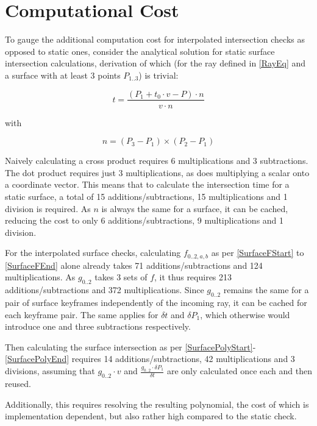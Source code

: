 \section{Computational Cost}

To gauge the additional computation cost for interpolated intersection checks as opposed to static ones,
consider the analytical solution for static surface intersection calculations,
derivation of which (for the ray defined in \eqref{RayEq} and a surface with at least 3 points \(P_{1..3}\)) is trivial:

\begin{equation}
    t = \frac{(P_1 + t_0 \cdot v - P) \cdot n}{v \cdot n}
\end{equation}

with

\begin{equation}
    n = (P_3 - P_1) \times (P_2 - P_1)
\end{equation}

Naively calculating a cross product requires 6 multiplications and 3 subtractions.
The dot product requires just 3 multiplications, as does multiplying a scalar onto a coordinate vector.
This means that to calculate the intersection time for a static surface,
a total of 15 additions/subtractions, 15 multiplications and 1 division is required.
As \(n\) is always the same for a surface, it can be cached,
reducing the cost to only 6 additions/subtractions, 9 multiplications and 1 division.

For the interpolated surface checks, calculating \(f_{0..2, a, b}\) as per \eqref{SurfaceFStart} to \eqref{SurfaceFEnd}
alone already takes 71 additions/subtractions and 124 multiplications.
As \(g_{0..2}\) takes 3 sets of \(f\), it thus requires 213 additions/subtractions and 372 multiplications.
Since \(g_{0..2}\) remains the same for a pair of surface keyframes independently of the incoming ray,
it can be cached for each keyframe pair. The same applies for \(\delta t\) and \(\delta P_1\),
which otherwise would introduce one and three subtractions respectively.

Then calculating the surface intersection as per \eqref{SurfacePolyStart}-\eqref{SurfacePolyEnd}
requires 14 additions/subtractions, 42 multiplications and 3 divisions,
assuming that \(g_{0..2} \cdot v\) and \(\frac{g_{0..2} \cdot \delta P_1}{\delta t}\)
are only calculated once each and then reused.

Additionally, this requires resolving the resulting polynomial,
the cost of which is implementation dependent, but also rather high compared to the static check.
